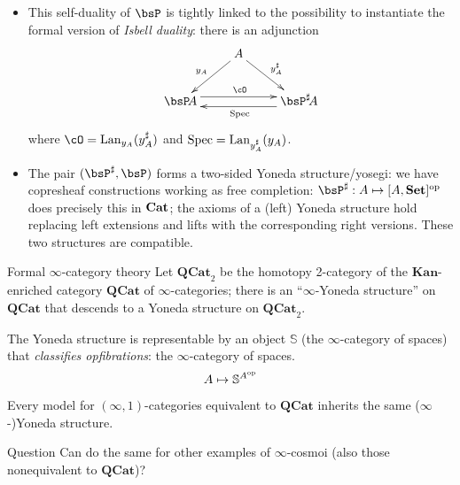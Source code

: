 \documentclass{beamer}
\begin{document}
\begin{frame}
	\begin{itemize}
		\item This self-duality of $\bsP$ is tightly linked to the possibility to instantiate the formal version of \emph{Isbell duality}: there is an adjunction
		      \[
			      \vcenter{\xymatrix{
					      &A\ar[dr]^{y_A^\sharp}\ar[dl]_{y_A}&\\
					      \bsP\! A \ar@<4pt>[rr]^{\cO} && \ar@<4pt>[ll]^\Spec \bsP^\sharp\! A
				      }}
		      \]
		      where $\cO = \Lan_{y_A}(y_A^\sharp)$ and $\text{Spec} = \mathrm{Lan}_{y_A^\sharp}(y_A)$.
		\item<2-> The pair $(\bsP^\sharp,\bsP)$ forms a two-sided Yoneda structure/yosegi: we have \alert{copresheaf} constructions working as free \alert{completion}: $\bsP^\sharp : A \mapsto [A,\Set]^\op$ does precisely this in $\mathbf{Cat}$; the axioms of a (left) Yoneda structure hold replacing \alert{left} extensions and lifts with the corresponding \alert{right} versions. These two structures are \alert{compatible}.
	\end{itemize}
\end{frame}
\begin{frame}{Formal $\infty$-category theory}
	Let $\mathbf{QCat}_2$ be the \alert{homotopy 2-category} of the $\mathbf{Kan}$-enriched category $\mathbf{QCat}$ of $\infty$-categories; there is an ``$\infty$-Yoneda structure'' on $\mathbf{QCat}$ that descends to a Yoneda structure on $\mathbf{QCat}_2$.

	 The Yoneda structure is \alert{representable} by an object $\mathbb{S}$ (the $\infty$-category of spaces) that \emph{classifies opfibrations}: the $\infty$-category of spaces. 
	\[A\mapsto \mathbb{S}^{A^{\text{op}}}\]
	Every model for $(\infty,1)$-categories equivalent to $\mathbf{QCat}$ inherits the same ($\infty$-)Yoneda structure.
	\begin{block}{Question}
		Can do the same for other examples of $\infty$-cosmoi (also those nonequivalent to $\mathbf{QCat}$)?
	\end{block}
\end{frame}
\end{document}
